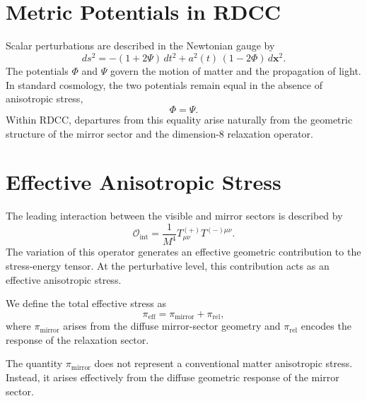 \documentclass[11pt,a4paper]{article}
\begin{document}
\section{Metric Potentials in RDCC}

Scalar perturbations are described in the Newtonian gauge by
\begin{equation}
  ds^{2}
  =
  -(1+2\Psi)\,dt^{2}
  +
  a^{2}(t)\,(1-2\Phi)\,d\mathbf{x}^{2}.
\end{equation}
The potentials \(\Phi\) and \(\Psi\) govern the motion of matter and the
propagation of light. In standard cosmology, the two potentials remain equal in
the absence of anisotropic stress,
\begin{equation}
  \Phi = \Psi.
\end{equation}
Within RDCC, departures from this equality arise naturally from the geometric
structure of the mirror sector and the dimension-8 relaxation operator.

\section{Effective Anisotropic Stress}

The leading interaction between the visible and mirror sectors is described by
\begin{equation}
  \mathcal{O}_{\mathrm{int}}
  =
  \frac{1}{M^{4}}
  T_{\mu\nu}^{(+)} T^{(-)\mu\nu}.
\end{equation}
The variation of this operator generates an effective geometric contribution to
the stress-energy tensor. At the perturbative level, this contribution acts as
an effective anisotropic stress.

We define the total effective stress as
\begin{equation}
  \pi_{\mathrm{eff}}
  =
  \pi_{\mathrm{mirror}}
  +
  \pi_{\mathrm{rel}},
\end{equation}
where \(\pi_{\mathrm{mirror}}\) arises from the diffuse mirror-sector geometry
and \(\pi_{\mathrm{rel}}\) encodes the response of the relaxation sector.

The quantity \(\pi_{\mathrm{mirror}}\) does not represent a conventional matter
anisotropic stress. Instead, it arises effectively from the diffuse geometric
response of the mirror sector.
\end{document}
